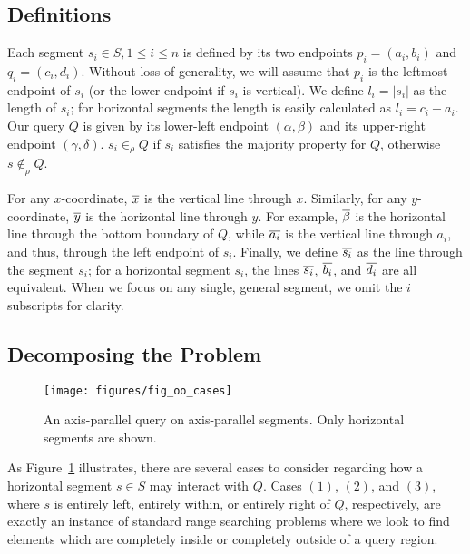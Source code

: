 \subsection{Definitions}
\label{:rectangles:ap:defs}

Each segment $s_i \in S, 1 \leq i \leq n$ is defined by its two endpoints $p_i = (a_i, b_i)$ and $q_i = (c_i, d_i)$. Without loss of generality, we will assume that $p_i$ is the leftmost endpoint of $s_i$ (or the lower endpoint if $s_i$ is vertical). We define $l_i = |s_i|$ as the length of $s_i$; for horizontal segments the length is easily calculated as $l_i = c_i - a_i$. Our query $Q$ is given by its lower-left endpoint $(\alpha, \beta)$ and its upper-right endpoint $(\gamma, \delta)$. $s_i \in_\rho Q$ if $s_i$ satisfies the majority property for $Q$, otherwise $s \not \in_\rho Q$.

For any $x$-coordinate, $\overline{x}$ is the vertical line through $x$. Similarly, for any $y$-coordinate, $\overline{y}$ is the horizontal line through $y$. For example, $\overline{\beta}$ is the horizontal line through the bottom boundary of $Q$, while $\overline{a_i}$ is the vertical line through $a_i$, and thus, through the left endpoint of $s_i$. Finally, we define $\overline{s_i}$ as the line through the segment $s_i$; for a horizontal segment $s_i$, the lines $\overline{s_i}$, $\overline{b_i}$, and $\overline{d_i}$ are all equivalent. When we focus on any single, general segment, we omit the $i$ subscripts for clarity.


\subsection{Decomposing the Problem}
\label{:rectangles:ap:approach}

\begin{figure}[t]
\centering
\texttt{[image: figures/fig\_oo\_cases]}
\caption[The different cases of axis-parallel segments.]{An axis-parallel query on axis-parallel segments. Only horizontal segments are shown.}
\label{:fig:rectangles:ap:cases}
\end{figure}

As Figure~\ref{:fig:rectangles:ap:cases} illustrates, there are several cases to consider regarding how a horizontal segment $s \in S$ may interact with $Q$. Cases $(1)$, $(2)$, and $(3)$, where $s$ is entirely left, entirely within, or entirely right of $Q$, respectively, are exactly an instance of  standard range searching problems where we look to find elements which are completely inside or completely outside of a query region.  

